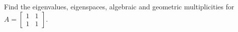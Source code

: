 Find the eigenvalues, eigenspaces, algebraic and geometric multiplicities for  
$A = \begin{bmatrix}
1 & 1\\
1 & 1
\end{bmatrix}.$